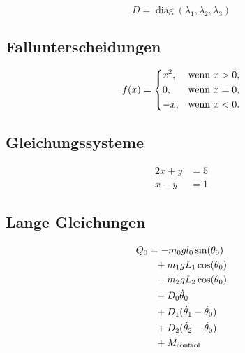 \documentclass[11pt,a4paper]{scrartcl}
\DeclareMathOperator{\diag}{diag}
\begin{document}
	\begin{equation}
		D=\diag(\lambda_1,\lambda_2,\lambda_3)
	\end{equation}
	
	\subsection{Fallunterscheidungen}
	
	\begin{equation}
		f(x)=
		\begin{dcases}
			x^2, & \text{wenn }x>0,\\
			0, & \text{wenn }x=0,\\
			-x, & \text{wenn }x<0.
		\end{dcases}
	\end{equation}
	
	\subsection{Gleichungssysteme}
	
	\begin{equation}
		\begin{aligned}
			2x+y &= 5\\
			x-y &= 1
		\end{aligned}
	\end{equation}
	
	\subsection{Lange Gleichungen}
	
	\begin{align}
		\MoveEqLeft
		Q_0=-m_0gl_0\sin(\theta_0)
		\notag\\
		&+m_1gL_1\cos(\theta_0)
		\notag\\
		&-m_2gL_2\cos(\theta_0)
		\notag\\
		&-D_0\dot{\theta}_0
		\notag\\
		&+D_1(\dot{\theta}_1-\dot{\theta}_0)
		\notag\\
		&+D_2(\dot{\theta}_2-\dot{\theta}_0)
		\notag\\
		&+M_{\mathrm{control}}
	\end{align}
\end{document}
